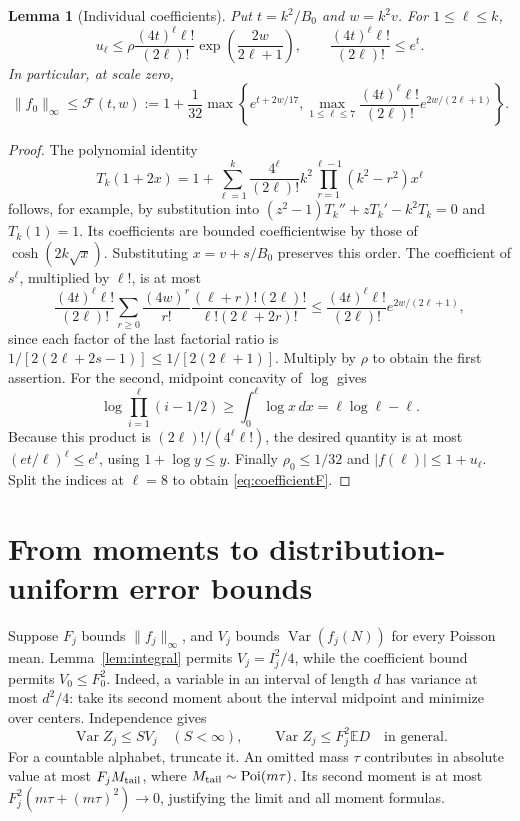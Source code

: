\documentclass[10pt]{article}
\newtheorem{lemma}{Lemma}
\newcommand{\E}{\mathbb E}
\newcommand{\Var}{\operatorname{Var}}
\newcommand{\Poi}{\operatorname{Poi}}
\begin{document}
\begin{lemma}[Individual coefficients]\label{lem:coefficient}
Put $t=k^2/B_0$ and $w=k^2v$. For $1\le\ell\le k$,
\begin{equation}\label{eq:individual}
 u_\ell\le\rho\frac{(4t)^\ell\ell!}{(2\ell)!}
                   \exp\left(\frac{2w}{2\ell+1}\right),\qquad
 \frac{(4t)^\ell\ell!}{(2\ell)!}\le e^t.
\end{equation}
In particular, at scale zero,
\begin{equation}\label{eq:coefficientF}
 \|f_0\|_\infty\le\mathcal F(t,w):=
 1+\frac1{32}\max\left\{e^{t+2w/17},
 \max_{1\le\ell\le7}\frac{(4t)^\ell\ell!}{(2\ell)!}e^{2w/(2\ell+1)}\right\}.
\end{equation}
\end{lemma}
\begin{proof}
The polynomial identity
\[
 T_k(1+2x)=1+\sum_{\ell=1}^k
 \frac{4^\ell}{(2\ell)!}k^2\prod_{r=1}^{\ell-1}(k^2-r^2)x^\ell
\]
follows, for example, by substitution into
$(z^2-1)T_k''+zT_k'-k^2T_k=0$ and $T_k(1)=1$.
Its coefficients are bounded coefficientwise by those of
$\cosh(2k\sqrt x)$. Substituting $x=v+s/B_0$ preserves this order.
The coefficient of $s^\ell$, multiplied by $\ell!$, is at most
\[
 \frac{(4t)^\ell\ell!}{(2\ell)!}
 \sum_{r\ge0}\frac{(4w)^r}{r!}
 \frac{(\ell+r)!(2\ell)!}{\ell!(2\ell+2r)!}
 \le\frac{(4t)^\ell\ell!}{(2\ell)!}e^{2w/(2\ell+1)},
\]
since each factor of the last factorial ratio is
$1/[2(2\ell+2s-1)]\le1/[2(2\ell+1)]$.
Multiply by $\rho$ to obtain the first assertion.
For the second, midpoint concavity of $\log$ gives
\[
 \log\prod_{i=1}^\ell(i-1/2)\ge\int_0^\ell\log x\,dx
 =\ell\log\ell-\ell.
\]
Because this product is $(2\ell)!/(4^\ell\ell!)$, the desired quantity
is at most $(et/\ell)^\ell\le e^t$, using $1+\log y\le y$.
Finally $\rho_0\le1/32$ and $|f(\ell)|\le1+u_\ell$.
Split the indices at $\ell=8$ to obtain \eqref{eq:coefficientF}.
\end{proof}

\section{From moments to distribution-uniform error bounds}
Suppose $F_j$ bounds $\|f_j\|_\infty$, and $V_j$ bounds
$\Var(f_j(N))$ for every Poisson mean. Lemma~\ref{lem:integral} permits
$V_j=I_j^2/4$, while the coefficient bound permits $V_0\le F_0^2$.
Indeed, a variable in an interval of length $d$ has variance at most $d^2/4$:
take its second moment about the interval midpoint and minimize over centers.
Independence gives
\begin{equation}\label{eq:variance}
 \Var Z_j\le S V_j\quad(S<\infty),\qquad
 \Var Z_j\le F_j^2\E D\quad\text{in general}.
\end{equation}
For a countable alphabet, truncate it. An omitted mass $\tau$ contributes
in absolute value at most $F_j M_{\rm tail}$, where
$M_{\rm tail}\sim\Poi(m\tau)$. Its second moment is at most
$F_j^2(m\tau+(m\tau)^2)\to0$, justifying the limit and all moment formulas.
\end{document}
